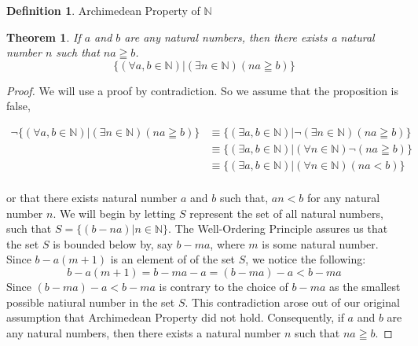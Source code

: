 \documentclass{book}
\newtheorem{theorem}{Theorem}[section]
\theoremstyle{definition}
\newtheorem{definition}{Definition}[section]
\theoremstyle{remark}
\newcommand{\bb}[1]{\mathbb{#1}}
\begin{document}
\newpage
\begin{definition}
Archimedean Property of $\bb{N}$ \\ 

\begin{tcolorbox}
	\begin{theorem}		
		If $a$ and $b$ are any natural numbers, then there exists a natural number $n$ such that $na \geqq b$.
		    \begin{equation*}
		        \{ (\forall a, b \in \bb{N}) | (\exists n \in \bb{N})(na \geqq b) \}
		    \end{equation*}
	\end{theorem}
\end{tcolorbox}

\begin{proof}
   
    We will use a proof by contradiction. So we assume that the proposition is false,
    
        \begin{align*}
            \neg \{ (\forall a, b \in \bb{N})| (\exists n \in \bb{N})(na \geqq b) \} & \equiv \{ (\exists a, b \in \bb{N})| \neg (\exists n \in \bb{N})(na \geqq b) \} \nonumber\\
                   & \equiv \{ (\exists a, b \in \bb{N})| (\forall n \in \bb{N}) \neg (na \geqq b) \} \nonumber\\
                   & \equiv \{ (\exists a, b \in \bb{N})| (\forall n \in \bb{N})(na < b) \} \nonumber\\
        \end{align*}
    
    or that there exists natural number $a$ and $b$ such that, $an < b$ for any natural number $n$. We will begin by letting $S$ represent the set of all natural numbers, such  that  $S = \{(b-na)| n \in \bb{N} \}$. The Well-Ordering Principle assures us that the set $S$ is bounded below by, say $b-ma$, where $m$ is some natural number. \\
    
    Since $b-a(m+1)$ is an element of of the set $S$, we notice the following: 
        \begin{equation*}
            b-a(m+1) =  b - ma - a = (b-ma) - a < b - ma
        \end{equation*}
    Since $(b -ma) - a < b - ma$ is contrary to the choice of $b-ma$ as the smallest possible natiural number in the set $S$. This contradiction arose out of our original assumption that Archimedean Property did not hold. Consequently, if $a$ and $b$ are any natural numbers, then there exists a natural number $n$ such that $na \geqq b$.
 
\end{proof}
\end{definition}
\end{document}
